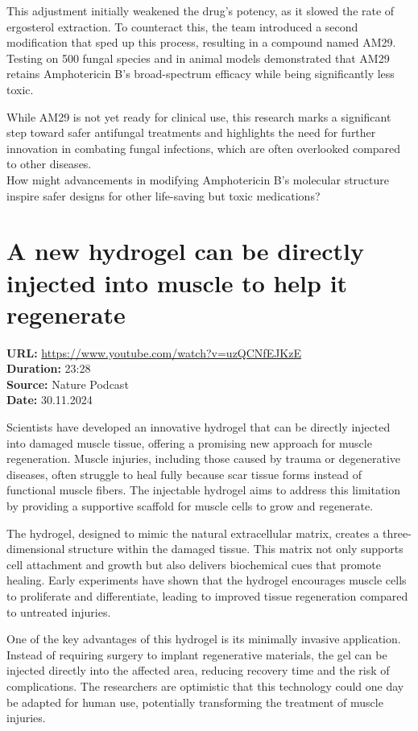 \documentclass[12pt]{article}
\begin{document}
This adjustment initially weakened the drug's potency, as it slowed the rate of ergosterol extraction. To counteract this, the team introduced a second modification that sped up this process, resulting in a compound named AM29. Testing on 500 fungal species and in animal models demonstrated that AM29 retains Amphotericin B’s broad-spectrum efficacy while being significantly less toxic.  

While AM29 is not yet ready for clinical use, this research marks a significant step toward safer antifungal treatments and highlights the need for further innovation in combating fungal infections, which are often overlooked compared to other diseases.\\[5px]  

How might advancements in modifying Amphotericin B’s molecular structure inspire safer designs for other life-saving but toxic medications?  



\newpage

\section{A new hydrogel can be directly injected into muscle to help it regenerate}
\textbf{URL:} \url{https://www.youtube.com/watch?v=uzQCNfEJKzE}\\
\textbf{Duration:} 23:28\\
\textbf{Source:} Nature Podcast\\
\textbf{Date:} 30.11.2024


Scientists have developed an innovative hydrogel that can be directly injected into damaged muscle tissue, offering a promising new approach for muscle regeneration. Muscle injuries, including those caused by trauma or degenerative diseases, often struggle to heal fully because scar tissue forms instead of functional muscle fibers. The injectable hydrogel aims to address this limitation by providing a supportive scaffold for muscle cells to grow and regenerate.  

The hydrogel, designed to mimic the natural extracellular matrix, creates a three-dimensional structure within the damaged tissue. This matrix not only supports cell attachment and growth but also delivers biochemical cues that promote healing. Early experiments have shown that the hydrogel encourages muscle cells to proliferate and differentiate, leading to improved tissue regeneration compared to untreated injuries.  

One of the key advantages of this hydrogel is its minimally invasive application. Instead of requiring surgery to implant regenerative materials, the gel can be injected directly into the affected area, reducing recovery time and the risk of complications. The researchers are optimistic that this technology could one day be adapted for human use, potentially transforming the treatment of muscle injuries.\\[5px]  
 
\end{document}
